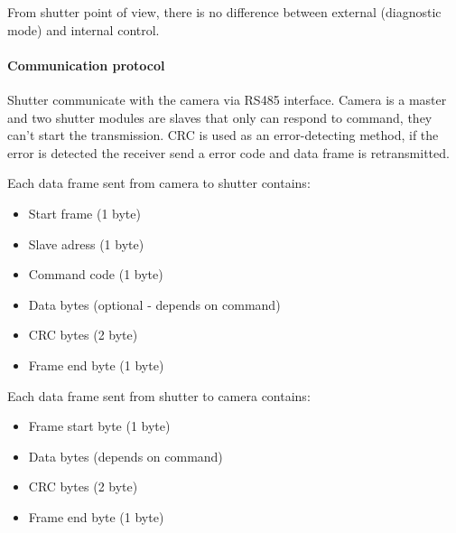 From shutter point of view, there is no difference between external (diagnostic mode) and internal control.

\paragraph{Communication protocol} 
Shutter communicate with the camera via RS485 interface. Camera is a master and two shutter modules are slaves that only can respond to command, they can't start the transmission. CRC is used as an error-detecting method, if the error is detected the receiver send a error code and data frame is retransmitted.


Each data frame sent from camera to shutter contains:
\begin{itemize}
\item Start frame (1 byte)
\item Slave adress  (1 byte)
\item Command code (1 byte)
\item Data bytes (optional - depends on command)
\item CRC bytes  (2 byte)
\item Frame end byte (1 byte)
\end{itemize}

Each data frame sent from shutter to camera contains:
\begin{itemize}
\item Frame start byte (1 byte)
\item Data bytes (depends on command)
\item CRC bytes (2 byte)
\item Frame end byte (1 byte)
\end{itemize}

